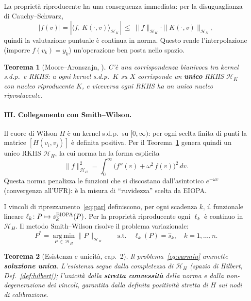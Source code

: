 \documentclass[11pt,a4paper]{article}
\theoremstyle{plain}
\newtheorem{teorema}{Teorema}[section]
\theoremstyle{definition}
\theoremstyle{remark}
\newcommand{\UFR}{\ensuremath{\mathrm{UFR}}}
\begin{document}
La propriet\`a riproducente ha una conseguenza immediata: per la disuguaglianza di
Cauchy--Schwarz,
\[
  |f(v)| = |\langle f,\,K(\cdot,v)\rangle_{\mathcal{H}_K}|
  \;\le\; \|f\|_{\mathcal{H}_K}\cdot\|K(\cdot,v)\|_{\mathcal{H}_K},
\]
quindi la valutazione puntuale \`e continua in norma. Questo rende l'interpolazione
(imporre $f(v_k) = y_k$) un'operazione ben posta nello spazio.

\begin{teorema}[Moore--Aronszajn, \cite{aronszajn1950}]
\label{thm:rkhs}
C'\`e una corrispondenza biunivoca tra kernel s.d.p.\ e RKHS: a ogni kernel s.d.p.\ $K$
su $X$ corrisponde un \textbf{unico} RKHS $\mathcal{H}_K$ con nucleo riproducente $K$, e
viceversa ogni RKHS ha un unico nucleo riproducente.
\end{teorema}

\paragraph{III. Collegamento con Smith--Wilson.}

Il cuore di Wilson $H$ \`e un kernel s.d.p.\ su $[0,\infty)$: per ogni scelta finita di
punti la matrice $[H(v_i,v_j)]$ \`e definita positiva. Per il
Teorema~\ref{thm:rkhs} genera quindi un unico RKHS $\mathcal{H}_H$, la cui norma ha la
forma esplicita
\[
  \|f\|_{\mathcal{H}_H}^2
  = \int_0^\infty \bigl(f''(v) + \omega^2\,f(v)\bigr)^2\,dv.
\]
Questa norma penalizza le funzioni che si discostano dall'asintotico $e^{-\omega v}$
(convergenza all'$\UFR$): \`e la misura di ``ruvidezza'' scelta da EIOPA.

I vincoli di riprezzamento~\eqref{eq:par} definiscono, per ogni scadenza $k$, il
funzionale lineare $\ell_k\colon P \mapsto s_k^{\rm EIOPA}(P)$. Per la propriet\`a
riproducente ogni $\ell_k$ \`e continuo in $\mathcal{H}_H$. Il metodo Smith--Wilson
risolve il problema variazionale:
\begin{equation}
  P^* = \operatorname*{arg\,min}_{P\,\in\,\mathcal{H}_H} \|P\|_{\mathcal{H}_H}
  \qquad \text{s.t.}\quad
  \ell_k(P) = \hat{s}_k,\quad k = 1,\dots,n.
  \label{eq:varmin}
\end{equation}

\begin{teorema}[Esistenza e unicità, \cite{berlinet2004} cap.~2]
\label{thm:existunique}
Il problema~\eqref{eq:varmin} ammette \textbf{soluzione unica}. L'esistenza segue dalla
completezza di $\mathcal{H}_H$ (spazio di Hilbert, Def.~\ref{def:hilbert}); l'unicit\`a
dalla \textbf{stretta convessit\`a} della norma e dalla non-degenerazione dei vincoli,
garantita dalla definita positivit\`a stretta di $H$ sui nodi di calibrazione.
\end{teorema}
\end{document}
